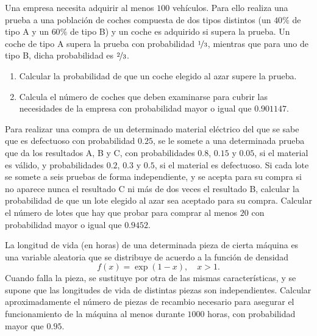 \begin{ejercicio}
    Una empresa necesita adquirir al menos $100$ vehículos. Para ello realiza una prueba a una población de coches compuesta de dos tipos distintos (un $40\%$ de tipo A y un $60\%$ de tipo B) y un coche es adquirido si supera la prueba. Un coche de tipo A supera la prueba con probabilidad $\nicefrac{1}{3}$, mientras que para uno de tipo B, dicha probabilidad es $\nicefrac{2}{3}$.
    \begin{enumerate}
        \item Calcular la probabilidad de que un coche elegido al azar supere la prueba.
        \item Calcula el número de coches que deben examinarse para cubrir las necesidades de la empresa con probabilidad mayor o igual que $0.901147$.
    \end{enumerate}
\end{ejercicio}

\begin{ejercicio}
    Para realizar una compra de un determinado material eléctrico del que se sabe que es defectuoso con probabilidad $0.25$, se le somete a una determinada prueba que da los resultados A, B y C, con probabilidades $0.8$, $0.15$ y $0.05$, si el material es válido, y probabilidades $0.2$, $0.3$ y $0.5$, si el material es defectuoso. Si cada lote se somete a seis pruebas de forma independiente, y se acepta para su compra si no aparece nunca el resultado C ni más de dos veces el resultado B, calcular la probabilidad de que un lote elegido al azar sea aceptado para su compra. Calcular el número de lotes que hay que probar para comprar al menos $20$ con probabilidad mayor o igual que $0.9452$.
\end{ejercicio}

\begin{ejercicio}
    La longitud de vida (en horas) de una determinada pieza de cierta máquina es una variable aleatoria que se distribuye de acuerdo a la función de densidad
    \[
        f (x) = \exp(1 - x), \quad x > 1.
    \]
    Cuando falla la pieza, se sustituye por otra de las mismas características, y se supone que las longitudes de vida de distintas piezas son independientes. Calcular aproximadamente el número de piezas de recambio necesario para asegurar el funcionamiento de la máquina al menos durante $1000$ horas, con probabilidad mayor que $0.95$.
\end{ejercicio}